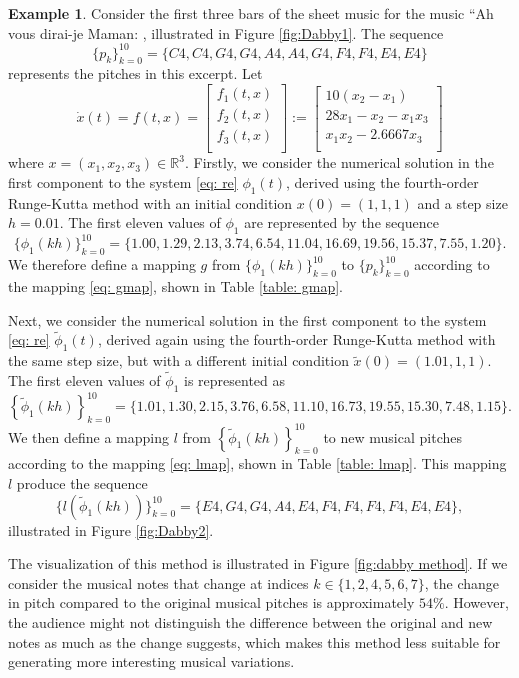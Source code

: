 \documentclass[11pt]{article}
\theoremstyle{definition}
\newtheorem{example}[theorem]{Example}
\begin{document}
\begin{example}
Consider the first three bars of the sheet music for the music ``Ah vous dirai-je Maman: \cite{hinson_12_1987}, illustrated in Figure \ref{fig:Dabby1}. 
The sequence
\[ \{p_k\}_{k=0}^{10} = \{C4, C4, G4, G4, A4, A4, G4, F4, F4, E4, E4\} \]
represents the pitches in this excerpt. 
Let 
\begin{equation} \label{eq: re}
\dot{x}(t) = f(t,x) = \begin{bmatrix}
 f_1(t, x) \\
 f_2(t, x) \\
 f_3(t, x) \\
\end{bmatrix}
:= 
\begin{bmatrix}
  10(x_2 - x_1) \\
  28x_1 - x_2 - x_1x_3 \\
  x_1x_2 - 2.6667x_3 \\
\end{bmatrix}
\end{equation} 
where $x = (x_1, x_2, x_3) \in \mathbb{R}^3$. 
Firstly, we consider the numerical solution in the first component to the system \eqref{eq: re} $\phi_1(t)$, derived using the fourth-order Runge-Kutta method with an initial condition $x(0) = (1,1,1)$ and a step size $h=0.01$.
The first eleven values of $\phi_1$ are represented by the sequence
 \[ \{ \phi_1(kh) \}_{k=0}^{10} = \{1.00, 1.29, 2.13, 3.74, 6.54, 11.04, 16.69, 19.56, 15.37, 7.55, 1.20\}. \]
We therefore define a mapping $g$ from $\{ \phi_1(kh) \}_{k=0}^{10}$ to $\{p_k\}_{k=0}^{10}$ according to the mapping \eqref{eq: gmap}, shown in Table \ref{table: gmap}.

Next, we consider the numerical solution in the first component to the system \eqref{eq: re} $\tilde{\phi}_1(t)$, derived again using the fourth-order Runge-Kutta method with the same step size, but with a different initial condition $\tilde{x}(0) = (1.01,1,1)$.
The first eleven values of $\tilde{\phi}_1$ is represented as
\[ \left\{\tilde{\phi}_1(kh) \right\}_{k=0}^{10} = \{ 1.01, 1.30, 2.15, 3.76, 6.58, 11.10, 16.73, 19.55, 15.30, 7.48, 1.15 \}. \] 
We then define a mapping $l$ from $\left\{\tilde{\phi}_1(kh) \right\}_{k=0}^{10}$ to new musical pitches according to the mapping \eqref{eq: lmap}, shown in Table \ref{table: lmap}.
This mapping $l$ produce the sequence \[ \{ l(\tilde{\phi}_1(kh)) \}_{k = 0}^{10} = \{E4, G4, G4, A4, E4, F4, F4, F4, F4, E4, E4 \}, \] illustrated in Figure \ref{fig:Dabby2}. 


The visualization of this method is illustrated in Figure \ref{fig:dabby method}. If we consider the musical notes that change at indices $k \in \{1, 2, 4, 5, 6, 7\}$, the change in pitch compared to the original musical pitches is approximately $54\%$. However, the audience might not distinguish the difference between the original and new notes as much as the change suggests, which makes this method less suitable for generating more interesting musical variations.


\end{example}
\end{document}
